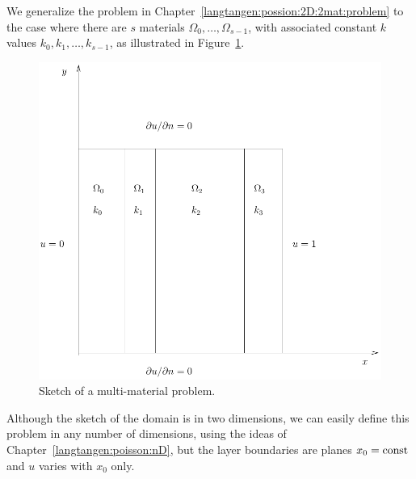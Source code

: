 We generalize the problem in Chapter~\ref{langtangen:possion:2D:2mat:problem}
to the case where there are $s$ materials $\Omega_0,\ldots,\Omega_{s-1}$,
with associated constant $k$ values $k_0,k_1,\ldots,k_{s-1}$,
as illustrated in Figure~\ref{langtangen:possion:nD:nmat:fig1}.
\begin{figure}
  \begin{center}
    \centerline{
      \includegraphics[width=0.7\linewidth]{chapters/langtangen/pdf/layers.pdf}
    }
    \caption{Sketch of a multi-material problem.}
    \label{langtangen:possion:nD:nmat:fig1}
  \end{center}
\end{figure}
Although the sketch of the domain is in two dimensions, we can easily
define this problem in any number of dimensions, using
the ideas of Chapter~\ref{langtangen:poisson:nD}, but the layer
boundaries are planes $x_0=\hbox{const}$ and $u$ varies with
$x_0$ only.

